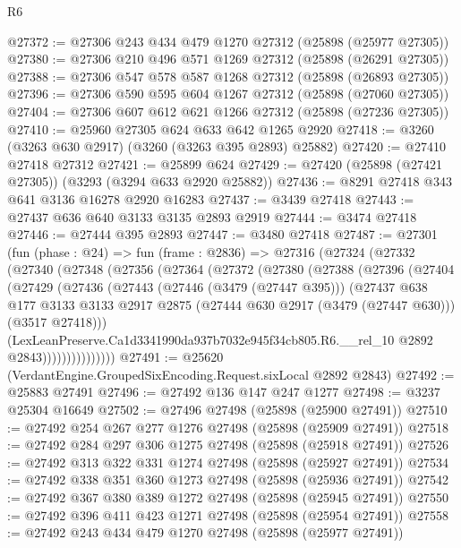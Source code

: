 \begin{lexlean}{R6}
\begin{coremodule}
@27372 := @27306 @243 @434 @479 @1270 @27312 (@25898 (@25977 @27305))
@27380 := @27306 @210 @496 @571 @1269 @27312 (@25898 (@26291 @27305))
@27388 := @27306 @547 @578 @587 @1268 @27312 (@25898 (@26893 @27305))
@27396 := @27306 @590 @595 @604 @1267 @27312 (@25898 (@27060 @27305))
@27404 := @27306 @607 @612 @621 @1266 @27312 (@25898 (@27236 @27305))
@27410 := @25960 @27305 @624 @633 @642 @1265 @2920
@27418 := @3260 (@3263 @630 @2917) (@3260 (@3263 @395 @2893) @25882)
@27420 := @27410 @27418 @27312
@27421 := @25899 @624
@27429 := @27420 (@25898 (@27421 @27305)) (@3293 (@3294 @633 @2920 @25882))
@27436 := @8291 @27418 @343 @641 @3136 @16278 @2920 @16283
@27437 := @3439 @27418
@27443 := @27437 @636 @640 @3133 @3135 @2893 @2919
@27444 := @3474 @27418
@27446 := @27444 @395 @2893
@27447 := @3480 @27418
@27487 := @27301
    (fun (phase : @24) =>
    fun (frame : @2836) =>
    @27316
      (@27324
        (@27332
          (@27340
            (@27348
              (@27356
                (@27364
                  (@27372
                    (@27380
                      (@27388
                        (@27396
                          (@27404
                            (@27429
                              (@27436
                                (@27443
                                  (@27446 (@3479 (@27447 @395)))
                                  (@27437
                                    @638
                                    @177
                                    @3133
                                    @3133
                                    @2917
                                    @2875
                                    (@27444 @630 @2917 (@3479 (@27447 @630)))
                                    (@3517 @27418)))
                                (LexLeanPreserve.Ca1d3341990da937b7032e945f34cb805.R6.__rel_10
                                  @2892
                                  @2843)))))))))))))))
@27491 := @25620 (VerdantEngine.GroupedSixEncoding.Request.sixLocal @2892 @2843)
@27492 := @25883 @27491
@27496 := @27492 @136 @147 @247 @1277
@27498 := @3237 @25304 @16649
@27502 := @27496 @27498 (@25898 (@25900 @27491))
@27510 := @27492 @254 @267 @277 @1276 @27498 (@25898 (@25909 @27491))
@27518 := @27492 @284 @297 @306 @1275 @27498 (@25898 (@25918 @27491))
@27526 := @27492 @313 @322 @331 @1274 @27498 (@25898 (@25927 @27491))
@27534 := @27492 @338 @351 @360 @1273 @27498 (@25898 (@25936 @27491))
@27542 := @27492 @367 @380 @389 @1272 @27498 (@25898 (@25945 @27491))
@27550 := @27492 @396 @411 @423 @1271 @27498 (@25898 (@25954 @27491))
@27558 := @27492 @243 @434 @479 @1270 @27498 (@25898 (@25977 @27491))

\end{coremodule}
\end{lexlean}
